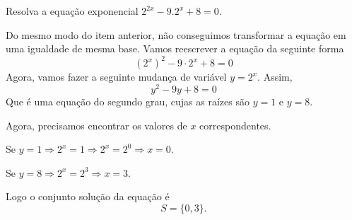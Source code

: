 \begin{example}
  Resolva a equação exponencial \(2^{2x}-9.2^x+8=0\).

  \solution
  Do mesmo modo do item anterior, não conseguimos transformar a equação
  em uma igualdade de mesma base. Vamos reescrever a equação da seguinte
  forma
  \[
    \left(2^x\right)^2 - 9 \cdot 2^x + 8 = 0
  \]
  Agora, vamos fazer a seguinte mudança de variável $y=2^x$. Assim,
  \[
    y^2 - 9y + 8 = 0
  \]
  Que é uma equação do segundo grau, cujas as raízes são $y=1$ e $y=8$.

  Agora, precisamos encontrar os valores de $x$ correspondentes.

  Se $y=1 \Rightarrow 2^x=1 \Rightarrow 2^x=2^0 \Rightarrow x=0$.

  Se $y=8 \Rightarrow 2^x=2^3 \Rightarrow x=3$.

  Logo o conjunto solução da equação é
  \[
     S=\{ 0, 3 \}.
  \]
\end{example}
